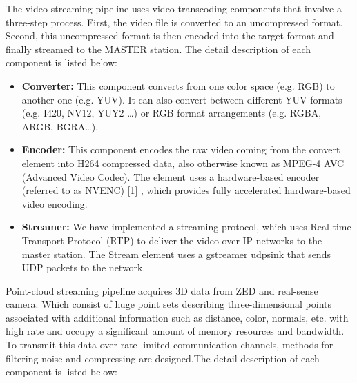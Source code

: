 The video streaming pipeline uses video transcoding components that involve a three-step process. First, the video file is converted to an uncompressed format. Second, this uncompressed format is then encoded into the target format and finally streamed to the MASTER station. The detail description of each component is listed below:
\begin{itemize}
    \item \textbf{Converter:} This component converts from one color space (e.g. RGB) to another one (e.g. YUV). It can also convert between different YUV formats (e.g. I420, NV12, YUY2 …) or RGB format arrangements (e.g. RGBA, ARGB, BGRA…).
    \item \textbf{Encoder:} This component encodes the raw video coming from the convert element into H264 compressed data, also otherwise known as MPEG-4 AVC (Advanced Video Codec). The element uses a hardware-based encoder (referred to as NVENC) [1] , which provides fully accelerated hardware-based video encoding.
    \item \textbf{Streamer:} We have implemented a streaming protocol, which uses Real-time Transport Protocol (RTP) to deliver the video over IP networks to the master station. The Stream element uses a gstreamer udpsink that sends UDP packets to the network.  

\end{itemize}


Point-cloud streaming pipeline acquires 3D data from ZED and real-sense camera. Which consist of huge point sets describing three-dimensional points associated with additional information such as distance, color, normals, etc. with high rate and occupy a significant amount of memory resources and bandwidth. To transmit this data over rate-limited communication channels, methods for filtering noise and compressing are designed.The detail description of each component is listed below: 

